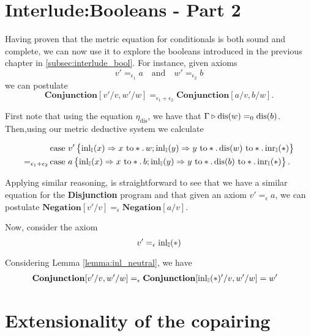 \section{Interlude:Booleans - Part 2}

Having proven that the metric equation for conditionals is both sound and complete, we can now use it to explore the booleans introduced in the previous chapter in \autoref{subsec:interlude_bool}. For instance, given axioms
$$ v' =_{\epsilon_1} a \quad \text{and}  \quad w' =_{\epsilon_2} b $$
we can postulate 
$$ \textbf{Conjunction} [v'/v, w'/w]  =_{\epsilon_1 + \epsilon_2}  \textbf{Conjunction} [a/v, b/w]. $$

First note that using the equation $\eta_{\text{dis}}$, we have that $\Gamma \triangleright \text{dis}(w) =_{0} \text{dis}(b)$.
Then,using our metric deductive system we calculate

\begin{align*}
  &\text{case } v'  
    \left\{ \begin{aligned}
    \mathrm{inl}_{\mathbb{I}}(x) \Rightarrow  x \text{ to} *. \, w ;  \mathrm{inl}_{\mathbb{I}}(y) \Rightarrow y \text{ to} *. \,  \text{dis}(w) \text{ to} *. \, \mathrm{inr}_{\mathbb{I}}(*)
  \end{aligned}  \right\}   \\
  =_{\epsilon_1 + \epsilon_2} \, & \text{case } a  
    \left\{ \begin{aligned}
     \mathrm{inl}_{\mathbb{I}}(x) \Rightarrow  x \text{ to} *. \, b ;  \mathrm{inl}_{\mathbb{I}}(y) \Rightarrow y \text{ to} *. \,  \text{dis}(b) \text{ to} *. \, \mathrm{inr}_{\mathbb{I}}(*)
  \end{aligned}  \right\}.
\end{align*}

Applying similar reasoning, is straightforward to see that we have a similar equation for the \textbf{Disjunction} program and that given an axiom $ v' =_{\epsilon} a $, we can postulate $\textbf{Negation} [v'/v] =_{\epsilon} \textbf{Negation} [a/v] $.

Now, consider the axiom
$$ v' =_{\epsilon} \mathrm{inl}_{\mathbb{I}}(*)$$

Considering Lemma \ref{lemma:inl_neutral}, we have
\begin{align*}
   \textbf{Conjunction} [v'/v, w'/w]  &=_{\epsilon}  \textbf{Conjunction} [ \mathrm{inl}_{\mathbb{I}}(*)'/v, w'/w] = w'
\end{align*}


\section{Extensionality of the copairing}

